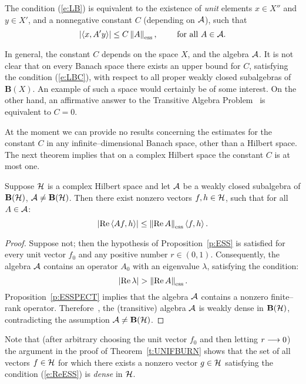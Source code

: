 \medskip

The condition (\ref{e:LB}) is equivalent to the existence of
{\em unit} elements $x\in{X''}$ and $y\in{X'}$, and a
nonnegative constant $C$ (depending on ${\cal A}$), such that
\begin{equation}\label{e:LBC}
 \abs{\seq{x,A'y}}\leq C \essnorm{A}, \qquad \text{ for all $A\in\A$}.
\end{equation}

In general, the constant $C$ depends on the space $X$, and the
algebra ${\cal A}$. It is not clear that on every Banach space there
exists an upper bound for $C$, satisfying the condition
(\ref{e:LBC}), with respect to all proper weakly closed
subalgebras of $\mathbf{B}(X)$. An example of such a space
would certainly be of some interest. On the other hand, an
affirmative answer to the Transitive Algebra
Problem~\cite{RR73} is equivalent to $C=0$.

\medskip

At the moment we can provide no results concerning the
estimates for the constant $C$ in any infinite--dimensional
Banach space, other than a Hilbert space. The next theorem
implies that on a complex Hilbert space the constant $C$ is at
most one.

\begin{thm}\label{t:UNIFBURN}
Suppose ${\cal H}$ is a complex Hilbert space and let ${\cal A}$ be a
weakly closed subalgebra of $\mathbf B(\cal H)$, ${\cal A}\neq\mathbf B(\cal H)$. Then there
exist nonzero vectors $f,h\in{\cal H}$, such that for all $A\in{\cal A}$:
\begin{equation}\label{e:ReESS}
  \abs{\RE\seq{A f,h}}\leq\essnorm{\RE A}\seq{f,h}.
\end{equation}
\end{thm}

\begin{proof}
Suppose not; then the hypothesis of Proposition~\ref{p:ESS} is
satisfied for every unit vector $f_0$ and any positive number
$r\in(0,1)$. Consequently, the algebra ${\cal A}$ contains an
operator $A_0$ with an eigenvalue $\lambda$, satisfying the
condition:
\[ \abs{\RE\lambda}>\essnorm{\RE{A}}. \]
Proposition~\ref{p:ESSPECT} implies that the algebra ${\cal A}$
contains a nonzero finite--rank operator.
Therefore~\cite[Theorem~8.2]{RR73}, the (transitive) algebra
${\cal A}$ is weakly dense in $\mathbf B(\cal H)$, contradicting the assumption
${\cal A}\neq\mathbf B(\cal H)$.
\end{proof}

\begin{rem}
Note that (after arbitrary choosing the unit vector $f_0$ and
then letting $r\longrightarrow0$) the argument in the proof of
Theorem~\ref{t:UNIFBURN} shows that the set of all vectors
$f\in{\cal H}$ for which there exists a nonzero vector $g\in{\cal H}$
satisfying the condition (\ref{e:ReESS}) is {\em dense} in
${\cal H}$.
\end{rem}


